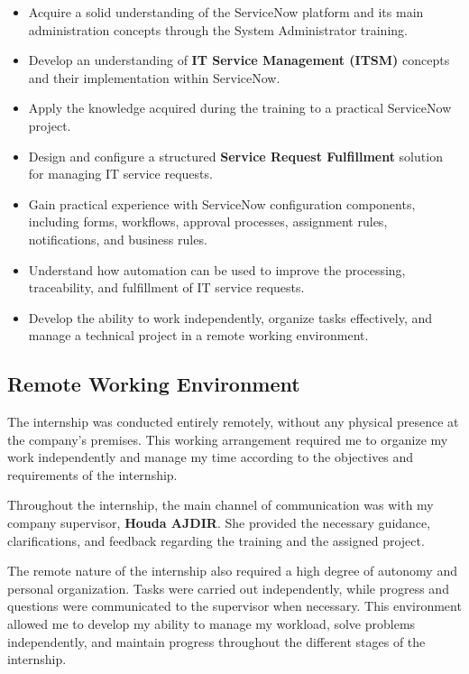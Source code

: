 \documentclass[12pt,a4paper]{report}
\begin{document}
\begin{itemize}
    \item Acquire a solid understanding of the ServiceNow platform and its
    main administration concepts through the System Administrator training.

    \item Develop an understanding of \textbf{IT Service Management (ITSM)}
    concepts and their implementation within ServiceNow.

    \item Apply the knowledge acquired during the training to a practical
    ServiceNow project.

    \item Design and configure a structured \textbf{Service Request Fulfillment}
    solution for managing IT service requests.

    \item Gain practical experience with ServiceNow configuration components,
    including forms, workflows, approval processes, assignment rules,
    notifications, and business rules.

    \item Understand how automation can be used to improve the processing,
    traceability, and fulfillment of IT service requests.

    \item Develop the ability to work independently, organize tasks
    effectively, and manage a technical project in a remote working
    environment.
\end{itemize}

\subsection{Remote Working Environment}

The internship was conducted entirely remotely, without any physical presence
at the company's premises. This working arrangement required me to organize my
work independently and manage my time according to the objectives and
requirements of the internship.

Throughout the internship, the main channel of communication was with my
company supervisor, \textbf{Houda AJDIR}. She provided the necessary guidance,
clarifications, and feedback regarding the training and the assigned project.

The remote nature of the internship also required a high degree of autonomy
and personal organization. Tasks were carried out independently, while
progress and questions were communicated to the supervisor when necessary.
This environment allowed me to develop my ability to manage my workload,
solve problems independently, and maintain progress throughout the different
stages of the internship.
\end{document}
